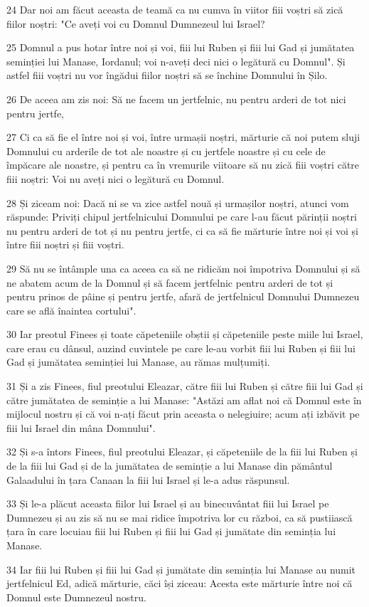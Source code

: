 \par 24 Dar noi am făcut aceasta de teamă ca nu cumva în viitor fiii voștri să zică fiilor noștri: "Ce aveți voi cu Domnul Dumnezeul lui Israel?
\par 25 Domnul a pus hotar între noi și voi, fiii lui Ruben și fiii lui Gad și jumătatea seminției lui Manase, Iordanul; voi n-aveți deci nici o legătură cu Domnul". Și astfel fiii voștri nu vor îngădui fiilor noștri să se închine Domnului în Șilo.
\par 26 De aceea am zis noi: Să ne facem un jertfelnic, nu pentru arderi de tot nici pentru jertfe,
\par 27 Ci ca să fie el între noi și voi, între urmașii noștri, mărturie că noi putem sluji Domnului cu arderile de tot ale noastre și cu jertfele noastre și cu cele de împăcare ale noastre, și pentru ca în vremurile viitoare să nu zică fiii voștri către fiii noștri: Voi nu aveți nici o legătură cu Domnul.
\par 28 Și ziceam noi: Dacă ni se va zice astfel nouă și urmașilor noștri, atunci vom răspunde: Priviți chipul jertfelnicului Domnului pe care l-au făcut părinții noștri nu pentru arderi de tot și nu pentru jertfe, ci ca să fie mărturie între noi și voi și între fiii noștri și fiii voștri.
\par 29 Să nu se întâmple una ca aceea ca să ne ridicăm noi împotriva Domnului și să ne abatem acum de la Domnul și să facem jertfelnic pentru arderi de tot și pentru prinos de pâine și pentru jertfe, afară de jertfelnicul Domnului Dumnezeu care se află înaintea cortului".
\par 30 Iar preotul Finees și toate căpeteniile obștii și căpeteniile peste miile lui Israel, care erau cu dânsul, auzind cuvintele pe care le-au vorbit fiii lui Ruben și fiii lui Gad și jumătatea seminției lui Manase, au rămas mulțumiți.
\par 31 Și a zis Finees, fiul preotului Eleazar, către fiii lui Ruben și către fiii lui Gad și către jumătatea de seminție a lui Manase: "Astăzi am aflat noi că Domnul este în mijlocul nostru și că voi n-ați făcut prin aceasta o nelegiuire; acum ați izbăvit pe fiii lui Israel din mâna Domnului".
\par 32 Și s-a întors Finees, fiul preotului Eleazar, și căpeteniile de la fiii lui Ruben și de la fiii lui Gad și de la jumătatea de seminție a lui Manase din pământul Galaadului în țara Canaan la fiii lui Israel și le-a adus răspunsul.
\par 33 Și le-a plăcut aceasta fiilor lui Israel și au binecuvântat fiii lui Israel pe Dumnezeu și au zis să nu se mai ridice împotriva lor cu război, ca să pustiiască țara în care locuiau fiii lui Ruben și fiii lui Gad și jumătate din seminția lui Manase.
\par 34 Iar fiii lui Ruben și fiii lui Gad și jumătate din seminția lui Manase au numit jertfelnicul Ed, adică mărturie, căci își ziceau: Acesta este mărturie între noi că Domnul este Dumnezeul nostru.

